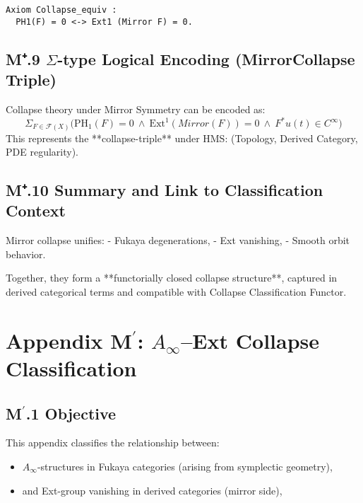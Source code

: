 \documentclass[11pt]{article}
\begin{document}
\begin{axiom}
\begin{axiom}
{{\begin{lstlisting}[language=Coq, caption=Collapse Functorial Equivalence in Coq Type Theory]
Axiom Collapse_equiv :
  PH1(F) = 0 <-> Ext1 (Mirror F) = 0.
\end{lstlisting}

\subsection*{M⁺.9 $\Sigma$-type Logical Encoding (MirrorCollapse Triple)}

Collapse theory under Mirror Symmetry can be encoded as:
\[
\Sigma_{F \in \mathcal{F}(X)} \Big( \mathrm{PH}_1(F) = 0 \ \wedge \ \mathrm{Ext}^1(Mirror(F)) = 0 \ \wedge \ F^\ast u(t) \in C^\infty \Big)
\]
This represents the **collapse-triple** under HMS:  
(Topology, Derived Category, PDE regularity).

\subsection*{M⁺.10 Summary and Link to Classification Context}

Mirror collapse unifies:
- Fukaya degenerations,
- Ext vanishing,
- Smooth orbit behavior.

Together, they form a **functorially closed collapse structure**,  
captured in derived categorical terms and compatible with Collapse Classification Functor.




\section*{Appendix M$^\prime$: $A_\infty$–Ext Collapse Classification}

\subsection*{M$^\prime$.1 Objective}

This appendix classifies the relationship between:

\begin{itemize}
  \item $A_\infty$-structures in Fukaya categories (arising from symplectic geometry),
  \item and Ext-group vanishing in derived categories (mirror side),
\end{itemize}

}}
\end{axiom}
\end{axiom}
\end{document}

